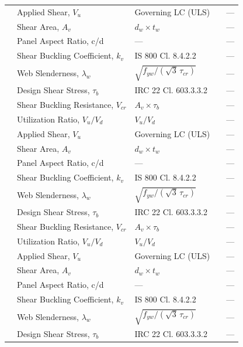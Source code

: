 \documentclass[12pt,a4paper]{report}
\numberwithin{table}{chapter}
\numberwithin{figure}{chapter}
\begin{document}
\begin{longtable}{|C{2.5cm}|C{3.5cm}|C{3.5cm}|>{\centering\arraybackslash}p{4.2cm}|C{1.8cm}|}
 & Applied Shear, $V_u$ & Governing LC (ULS) &  & --- \\[6pt]
 & Shear Area, $A_v$ & $d_w \times t_w$ &  & --- \\[6pt]
 & Panel Aspect Ratio, c/d & --- &  & --- \\[6pt]
 & Shear Buckling Coefficient, $k_v$ & IS 800 Cl. 8.4.2.2 &  & --- \\[6pt]
 & Web Slenderness, $\lambda_w$ & $\sqrt{f_{yw}/(\sqrt{3}\,\tau_{cr})}$ &  & --- \\[6pt]
 & Design Shear Stress, $\tau_b$ & IRC 22 Cl. 603.3.3.2 &  & --- \\[6pt]
 & Shear Buckling Resistance, $V_{cr}$ & $A_v \times \tau_b$ &  & --- \\[6pt]
 & Utilization Ratio, $V_u / V_d$ & $V_u / V_d$ &  & --- \\[6pt]
\hline
{} & Applied Shear, $V_u$ & Governing LC (ULS) &  & --- \\[6pt]
 & Shear Area, $A_v$ & $d_w \times t_w$ &  & --- \\[6pt]
 & Panel Aspect Ratio, c/d & --- &  & --- \\[6pt]
 & Shear Buckling Coefficient, $k_v$ & IS 800 Cl. 8.4.2.2 &  & --- \\[6pt]
 & Web Slenderness, $\lambda_w$ & $\sqrt{f_{yw}/(\sqrt{3}\,\tau_{cr})}$ &  & --- \\[6pt]
 & Design Shear Stress, $\tau_b$ & IRC 22 Cl. 603.3.3.2 &  & --- \\[6pt]
 & Shear Buckling Resistance, $V_{cr}$ & $A_v \times \tau_b$ &  & --- \\[6pt]
 & Utilization Ratio, $V_u / V_d$ & $V_u / V_d$ &  & --- \\[6pt]
\hline
{} & Applied Shear, $V_u$ & Governing LC (ULS) &  & --- \\[6pt]
 & Shear Area, $A_v$ & $d_w \times t_w$ &  & --- \\[6pt]
 & Panel Aspect Ratio, c/d & --- &  & --- \\[6pt]
 & Shear Buckling Coefficient, $k_v$ & IS 800 Cl. 8.4.2.2 &  & --- \\[6pt]
 & Web Slenderness, $\lambda_w$ & $\sqrt{f_{yw}/(\sqrt{3}\,\tau_{cr})}$ &  & --- \\[6pt]
 & Design Shear Stress, $\tau_b$ & IRC 22 Cl. 603.3.3.2 &  & --- \\[6pt]

\end{longtable}
\end{document}
